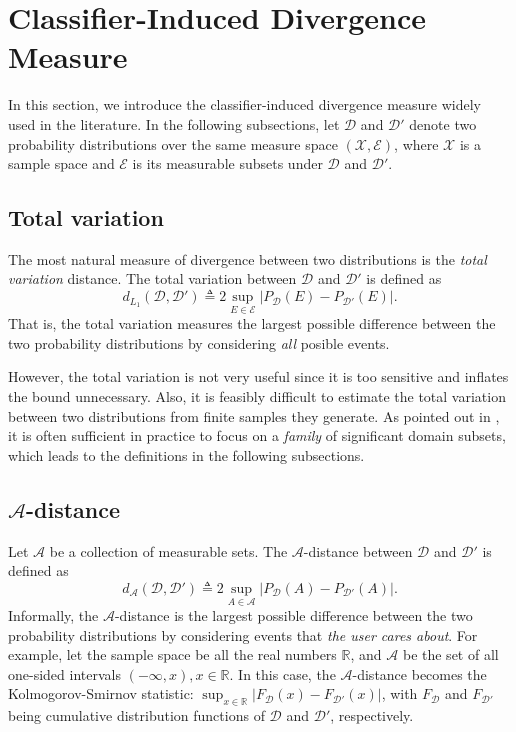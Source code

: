 \section{Classifier-Induced Divergence Measure}\label{sect:divergence}
In this section, we introduce the classifier-induced divergence measure widely used in the literature. In the following subsections, let $\mathcal{D}$ and $\mathcal{D}'$ denote two probability distributions over the same measure space $(\mathcal{X}, \mathcal{E})$, where $\mathcal{X}$ is a sample space and $\mathcal{E}$ is its measurable subsets under $\mathcal{D}$ and $\mathcal{D}'$.

\subsection{Total variation}
The most natural measure of divergence between two distributions is the \textit{total variation} distance. The total variation between $\mathcal{D}$ and $\mathcal{D}'$ is defined as
\begin{equation}\label{eq:total_var}
  d_{L_1}(\mathcal{D}, \mathcal{D}') \triangleq 2\sup_{E \in \mathcal{E}} \vert P_{\mathcal{D}}(E)-P_{\mathcal{D}'}(E) \vert.
\end{equation}
That is, the total variation measures the largest possible difference between the two probability distributions by considering \textit{all} posible events.

However, the total variation is not very useful since it is too sensitive and inflates the bound unnecessary. Also, it is feasibly difficult to estimate the total variation between two distributions from finite samples they generate. As pointed out in \cite{Kifer2004}, it is often sufficient in practice to focus on a \textit{family} of significant domain subsets, which leads to the definitions in the following subsections.

\subsection{$\mathcal{A}$-distance}
Let $\mathcal{A}$ be a collection of measurable sets. The $\mathcal{A}$-distance between $\mathcal{D}$ and $\mathcal{D}'$ is defined as
\begin{equation}\label{eq:a_distance}
  d_{\mathcal{A}}(\mathcal{D}, \mathcal{D}') \triangleq 2\sup_{A \in \mathcal{A}} \vert P_{\mathcal{D}}(A)-P_{\mathcal{D}'}(A) \vert.
\end{equation}
Informally, the $\mathcal{A}$-distance is the largest possible difference between the two probability distributions by considering events that \textit{the user cares about}. For example, let the sample space be all the real numbers $\mathbb{R}$, and $\mathcal{A}$ be the set of all one-sided intervals $(-\infty,x), x \in \mathbb{R}$. In this case, the $\mathcal{A}$-distance becomes the Kolmogorov-Smirnov statistic: $\sup_{x \in \mathbb{R}} \vert F_{\mathcal{D}}(x)-F_{\mathcal{D}'}(x) \vert$, with $F_{\mathcal{D}}$ and $F_{\mathcal{D'}}$ being cumulative distribution functions of $\mathcal{D}$ and $\mathcal{D}'$, respectively.

